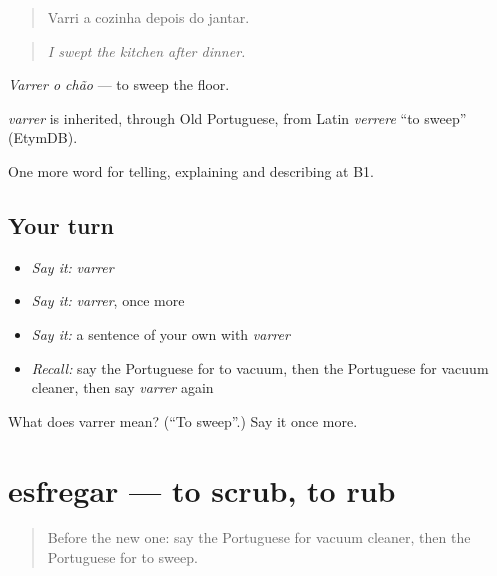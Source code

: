 \begin{quote}
Varri a cozinha depois do jantar.
\end{quote}

\begin{quote}
\emph{I swept the kitchen after dinner.}
\end{quote}

\emph{Varrer o chão} — to sweep the floor.

\begin{cousinweb}
\emph{varrer} is inherited, through Old Portuguese, from Latin \emph{verrere} \textquotedblleft{}to sweep\textquotedblright{} (EtymDB).
\end{cousinweb}

\begin{grammarlens}[title={What you've built}]
One more word for telling, explaining and describing at B1.
\end{grammarlens}

\subsection*{Your turn}
\begin{itemize}
\raggedright
  \item \emph{Say it:} \emph{varrer}
  \item \emph{Say it:} \emph{varrer}, once more
  \item \emph{Say it:} a sentence of your own with \emph{varrer}
  \item \emph{Recall:} say the Portuguese for to vacuum, then the Portuguese for vacuum cleaner, then say \emph{varrer} again
\end{itemize}

\begin{tcolorbox}[breakable,colback=teal!4,colframe=teal!35!black,title={Before you move on}]
What does varrer mean? (\textquotedblleft{}To sweep\textquotedblright{}.) Say it once more.
\end{tcolorbox}
\section[esfregar]{esfregar — to scrub, to rub}

\label{lesson:PT-C528-esfregar}



\begin{quote}
Before the new one: say the Portuguese for vacuum cleaner, then the Portuguese for to sweep.
\end{quote}

